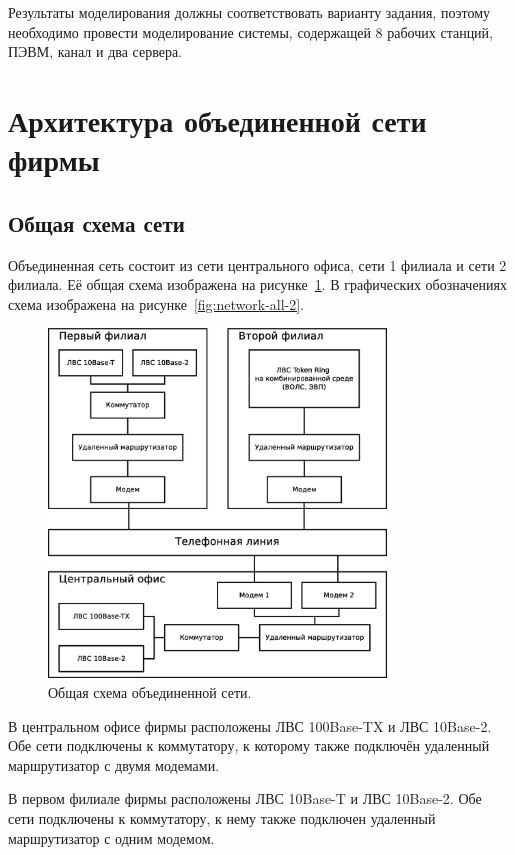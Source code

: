 \documentclass[russian,utf8,emptystyle]{eskdtext}
\begin{document}
Результаты моделирования должны соответствовать варианту задания, поэтому  необходимо провести  моделирование системы, содержащей 8 рабочих станций, ПЭВМ, канал и два сервера.

\clearpage
\section{Архитектура объединенной сети фирмы}
\subsection{Общая схема сети}
Объединенная сеть состоит из сети центрального офиса, сети 1 филиала и сети 2 филиала. Её общая схема изображена на рисунке~\ref{fig:network-all}. В графических обозначениях схема изображена на рисунке~\ref{fig:network-all-2}.

\begin{figure}[h!]
\centering
\includegraphics[width = 0.8\textwidth]{network-all}
\caption{Общая схема объединенной сети.}
\label{fig:network-all}
\end{figure}

В центральном офисе фирмы расположены ЛВС 100Base-TX и ЛВС 10Base-2. Обе сети подключены к коммутатору, к которому также подключён удаленный маршрутизатор с двумя модемами.

В первом филиале фирмы расположены ЛВС 10Base-T и ЛВС 10Base-2. Обе сети подключены к коммутатору, к нему также подключен удаленный маршрутизатор с одним модемом.
\end{document}
